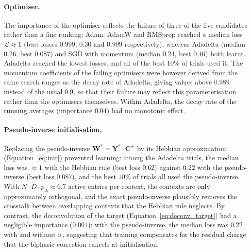 \documentclass{scrartcl}
\begin{document}
\paragraph{Optimiser.}
The importance of the optimiser reflects the failure of three of the five candidates rather than a fine ranking: Adam, AdamW and RMSprop reached a median loss $\mathcal{L} \approx 1$ (best losses $0.999$, $0.30$ and $0.999$ respectively), whereas Adadelta (median $0.26$, best $0.087$) and SGD with momentum (median $0.24$, best $0.16$) both learnt. Adadelta reached the lowest losses, and all of the best $10\%$ of trials used it. The momentum coefficients of the failing optimisers were however derived from the same search ranges as the decay rate of Adadelta, giving values above $0.989$ instead of the usual $0.9$, so that their failure may reflect this parameterisation rather than the optimisers themselves. Within Adadelta, the decay rate of the running averages (importance $0.04$) had no monotonic effect.

\paragraph{Pseudo-inverse initialisation.}
Replacing the pseudo-inverse $\mathbf{W}^* = \mathbf{Y}^* \cdot \mathbf{C}^+$ by its Hebbian approximation (Equation~\ref{eq:init}) prevented learning: among the Adadelta trials, the median loss was $\approx 1$ with the Hebbian rule (best loss $0.62$) against $0.22$ with the pseudo-inverse (best loss $0.087$), and the best $10\%$ of trials all used the pseudo-inverse. With $N \cdot D \cdot p_A \approx 6.7$ active entries per context, the contexts are only approximately orthogonal, and the exact pseudo-inverse plausibly removes the crosstalk between overlapping contexts that the Hebbian rule neglects. By contrast, the deconvolution of the target (Equation~\ref{eq:deconv_target}) had a negligible importance ($0.001$): with the pseudo-inverse, the median loss was $0.22$ with and without it, suggesting that training compensates for the residual charge that the biphasic correction cancels at initialisation.
\end{document}
